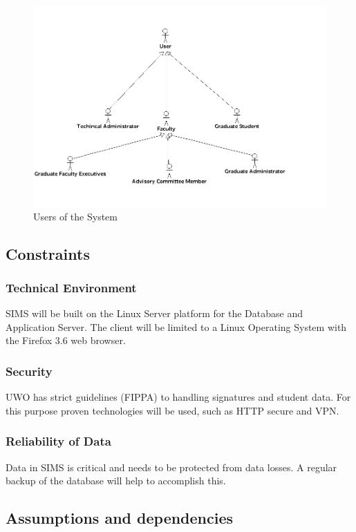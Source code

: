 \documentclass{journal}
\begin{document}
\begin{figure}[htp]
\centering
\includegraphics[scale=0.40]{diagrams/use_cases/UserHeirachy_uc.png}
\caption{Users of the System}
\label{fig:users}
\end{figure}

\subsection{Constraints}

\subsubsection{Technical Environment}
SIMS will be built on the Linux Server platform for the Database and Application Server. The client will be limited to a Linux Operating System with the Firefox 3.6 web browser.  
\subsubsection{Security}
UWO has strict guidelines (FIPPA) to handling signatures and student data. For this purpose proven technologies will be used, such as HTTP secure and VPN.
\subsubsection{Reliability of Data}
Data in SIMS is critical and needs to be protected from data losses. A regular backup of the database will help to accomplish this. 

\subsection{Assumptions and dependencies}
\end{document}
